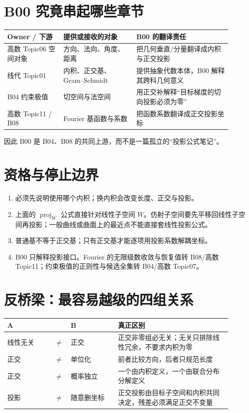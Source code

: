 \documentclass[profile=standard]{ipara-handbook}
\begin{document}
\section{B00 究竟串起哪些章节}
\begin{tabular}{p{0.23\linewidth}p{0.30\linewidth}p{0.39\linewidth}}
\hline
Owner / 下游 & 提供或接收的对象 & B00 的翻译责任\\
\hline
高数 Topic06 空间对象 & 方向、法向、角度、距离 & 把几何垂直/分量翻译成内积与正交投影\\
线代 Topic01 & 内积、正交基、Gram--Schmidt & 提供抽象代数本体，B00 解释其跨科几何意义\\
B04 约束极值 & 切空间与法空间 & 用正交补解释“目标梯度的切向投影必须为零”\\
高数 Topic11 / B08 & Fourier 基函数与系数 & 把函数系数翻译成正交投影坐标\\
\hline
\end{tabular}

因此 B00 是 B04、B08 的共同上游，而不是一篇孤立的“投影公式笔记”。

\section{资格与停止边界}
\begin{enumerate}
\item 必须先说明使用哪个内积；换内积会改变长度、正交与投影。
\item 上面的 $\operatorname{proj}_W$ 公式直接针对线性子空间 $W$。仿射子空间要先平移回线性子空间再投影；一般曲线或曲面上的最近点不能直接套线性投影公式。
\item 普通基不等于正交基；只有正交基才能逐项用投影系数解耦坐标。
\item B00 只解释投影接口。Fourier 的无限级数收敛与恢复值转 B08/高数 Topic11；约束极值的正则性与候选全集转 B04/高数 Topic07。
\end{enumerate}

\section{反桥梁：最容易越级的四组关系}
\begin{tabular}{p{0.20\linewidth}p{0.04\linewidth}p{0.20\linewidth}p{0.48\linewidth}}
\hline
A & & B & 真正区别\\
\hline
线性无关 & $\neq$ & 正交 & 正交非零组必无关；无关只排除线性冗余，不要求内积为零\\
正交 & $\neq$ & 单位化 & 前者比较方向，后者只规范长度\\
正交 & $\neq$ & 概率独立 & 一个由内积定义，一个由联合分布分解定义\\
投影 & $\neq$ & 随意删坐标 & 正交投影由目标子空间和内积共同决定，残差必须满足正交不变量\\
\hline
\end{tabular}
\end{document}
